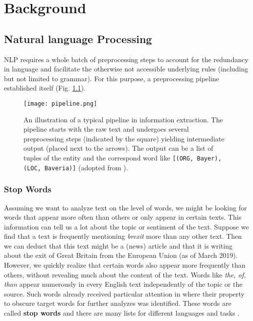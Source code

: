 \chapter{Background}


\section{Natural language Processing}
NLP requires a whole batch of preprocessing steps to account for the redundancy in language and facilitate the otherwise not accessible underlying rules (including but not limited to grammar). For this purpose, a preprocessing pipeline established itself (Fig. \ref{fig:pipeline}).

\begin{figure}[h!]
    \centering
    \texttt{[image: pipeline.png]}
    \caption{An illustration of a typical pipeline in information extraction. The pipeline starts with the raw text and undergoes several preprocessing steps (indicated by the square) yielding intermediate output (placed next to the arrows). The output can be a list of tuples of the entity and the correspond word like \texttt{[(ORG, \textquotesingle Bayer\textquotesingle), (LOC, \textquotesingle Baveria\textquotesingle)]} (adopted from \citep{Bird2009}).}
    \label{fig:pipeline}
\end{figure}

\subsection{Stop Words}
Assuming we want to analyze text on the level of words, we might be looking for
words that appear more often than others or only appear in certain texts.
This information can tell us a lot about the topic or sentiment of the text.
Suppose we find that a text is frequently mentioning \textit{brexit} more than any other text.
Then we can deduct that this text might be a (news) article and that it is writing about the exit of Great Britain from the European Union (as of March 2019).
However, we quickly realize that certain words also appear more frequently than others, without revealing much about the content of the text.
Words like \textit{the, of, than} appear numerously in every English text independently of the topic or the source.
Such words already received particular attention in \citeyear{Luhn1960} where their property to obscure target words for further analyzes was identified.
These words are called \textbf{stop words} and there are many lists for different languages and tasks \citep{RANKS2019}.

